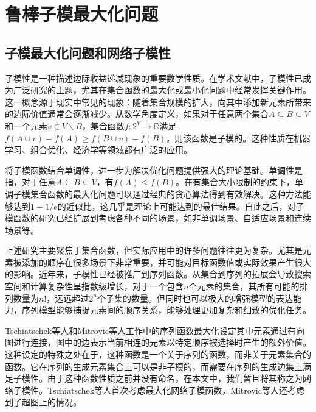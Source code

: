 \section{鲁棒子模最大化问题}
\label{sec:2_2}

\subsection{子模最大化问题和网络子模性}

子模性是一种描述边际收益递减现象的重要数学性质。在学术文献中，子模性已成为广泛研究的主题，尤其在集合函数的最大化或最小化问题中经常发挥关键作用\cite{nemhauser1978best,khuller1999budgeted}。这一概念源于现实中常见的现象：随着集合规模的扩大，向其中添加新元素所带来的边际价值通常会逐渐减少。从数学角度定义，如果对于任意两个集合$A\subseteq B \subseteq V$和一个元素$v\in V\backslash B$，集合函数$f: 2^V \to \mathbb{R}$满足$f(A\cup v) - f(A) \ge f(B\cup v) -f(B)$，则该函数是子模的。这种性质在机器学习、组合优化、经济学等领域都有广泛的应用\cite{krause2005near,lin2011class,shi2021profit,kirchhoff2014submodularity,gabillon2013adaptive,kempe2003maximizing,wang2021efficient}。

将子模函数结合单调性，进一步为解决优化问题提供强大的理论基础。单调性是指，对于任意$A\subseteq B\subseteq V$，有$f(A)\le f(B)$。在有集合大小限制的约束下，单调子模集合函数的最大化问题可以通过经典的贪心算法得到有效解决。这种方法能够达到$1-1/e$的近似比\cite{nemhauser1978best}，这几乎是理论上可能达到的最佳结果。自此之后，对子模函数的研究已经扩展到考虑各种不同的场景，如非单调场景、自适应场景和连续场景等\cite{feige2007maximizing,golovin2011adaptive,das2011submodular,bach2019submodular,shi2019adaptive}。

上述研究主要聚焦于集合函数，但实际应用中的许多问题往往更为复杂。尤其是元素被添加的顺序在很多场景下非常重要，并可能对目标函数值或实际效果产生很大的影响。近年来，子模性已经被推广到序列函数\cite{zhang2015string,tschiatschek2017selecting,streeter2008online,zhang2013near}。从集合到序列的拓展会导致搜索空间和计算复杂性呈指数级增长，对于一个包含$n$个元素的集合，其所有可能的排列数量为$n!$，远远超过$2^n$个子集的数量。但同时也可以极大的增强模型的表达能力，序列模型能够捕捉元素间的顺序关系，能够处理更加复杂和细致的优化任务。

Tschiatschek等人\cite{tschiatschek2017selecting}和Mitrovic等人\cite{mitrovic2018submodularity}工作中的序列函数最大化设定其中元素通过有向图进行连接，图中的边表示当前相连的元素以特定顺序被选择时产生的额外价值。这种设定的特殊之处在于，这种函数是一个关于序列的函数，而非关于元素集合的函数。它在序列的生成元素集合上可以是非子模的，而需要在序列的生成边集上满足子模性。由于这种函数性质之前并没有命名，在本文中，我们暂且将其称之为网络子模性。Tschiatschek等人\cite{tschiatschek2017selecting}首次考虑最大化网络子模函数，Mitrovic等人\cite{mitrovic2018submodularity}还考虑到了超图上的情况。

